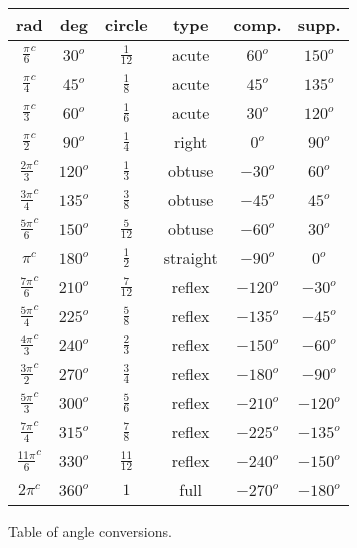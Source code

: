 \begin{figure}[htb]
\caption{Table of angle conversions.}
\label{fig:table_of_angles}
\begin{center}
\begin{tabular}{ |c | c | c | c | c | c |}
\hline 
rad & deg & circle & type & comp. & supp. \\
\hline 
$\frac{\pi}{6}^c$ & $30^o$ & $\frac{1}{12}$ & acute & $60^o$ & $150^o$\\
\hline
$\frac{\pi}{4}^c$ & $45^o$ & $\frac{1}{8}$ & acute & $45^o$ & $135^o$\\
\hline
$\frac{\pi}{3}^c$ & $60^o$ & $\frac{1}{6}$ & acute & $30^o$ & $120^o$\\
\hline
$\frac{\pi}{2}^c$ & $90^o$ & $\frac{1}{4}$ & right & $0^o$ & $90^o$\\
\hline
$\frac{2\pi}{3}^c$ & $120^o$ & $\frac{1}{3}$ & obtuse & $-30^o$ & $60^o$\\
\hline
$\frac{3\pi}{4}^c$ & $135^o$ & $\frac{3}{8}$ & obtuse & $-45^o$ & $45^o$\\
\hline
$\frac{5\pi}{6}^c$ & $150^o$ & $\frac{5}{12}$ & obtuse & $-60^o$ & $30^o$\\
\hline
$\pi^c$ & $180^o$ & $\frac{1}{2}$ & straight & $-90^o$ & $0^o$\\
\hline
$\frac{7\pi}{6}^c$ & $210^o$ & $\frac{7}{12}$ & reflex & $-120^o$ & $-30^o$\\
\hline
$\frac{5\pi}{4}^c$ & $225^o$ & $\frac{5}{8}$ & reflex & $-135^o$ & $-45^o$\\
\hline
$\frac{4\pi}{3}^c$ & $240^o$ & $\frac{2}{3}$ & reflex & $-150^o$ & $-60^o$\\
\hline
$\frac{3\pi}{2}^c$ & $270^o$ & $\frac{3}{4}$ & reflex & $-180^o$ & $-90^o$\\
\hline
$\frac{5\pi}{3}^c$ & $300^o$ & $\frac{5}{6}$ & reflex & $-210^o$ & $-120^o$\\
 \hline
$\frac{7\pi}{4}^c$ & $315^o$ & $\frac{7}{8}$ & reflex & $-225^o$ & $-135^o$\\
\hline
$\frac{11\pi}{6}^c$ & $330^o$ & $\frac{11}{12}$ & reflex & $-240^o$ & $-150^o$\\
\hline
$2\pi^c$ & $360^o$ & $1$ & full & $-270^o$ & $-180^o$\\
\hline

\end{tabular}
\end{center}
\end{figure}






